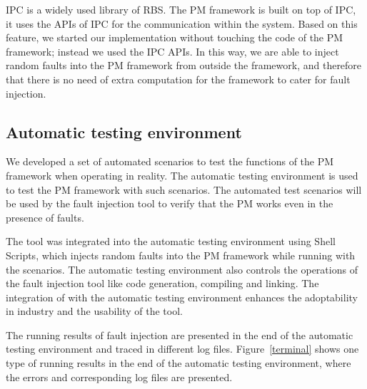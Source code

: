 IPC is a widely used library of RBS. The PM framework is built on top of IPC, it uses the APIs of IPC for the communication within the system. Based on this feature, we started our implementation without touching the code of the PM framework; instead we used the IPC APIs. In this way, we are able to inject random faults into the PM framework from outside the framework, and therefore that there is no need of extra computation for the framework to cater for fault injection. %

\subsection{Automatic testing environment}\label{sec:PM}
We developed a set of automated scenarios %
to test the functions of the PM framework %
when operating in reality. %
The automatic testing environment is used to test the PM framework with such scenarios. The automated test scenarios will be used by the fault injection tool to verify that the PM works even in the presence of faults. 

The \approach{} tool was integrated into the automatic testing environment using Shell Scripts, which injects random faults into the PM framework while running with the scenarios. The automatic testing environment also controls the operations of the fault injection tool like code generation, compiling and linking. The integration of \approach{} with  the automatic testing environment enhances the adoptability in industry and the usability of the tool.


The running results of fault injection are presented in the end of the automatic testing environment and traced in different log files. Figure~\ref{terminal} shows one type of running results in the end of the automatic testing environment, where the errors and corresponding log files are presented.

